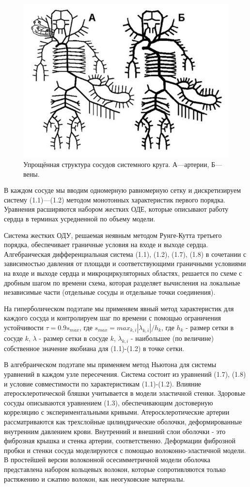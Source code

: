 \documentclass[a4paper, 14pt]{article}
\begin{document}
\begin{figure}[h]
\centering
\includegraphics[width=0.5\linewidth]{krug.png}
\caption{Упрощённая структура сосудов системного круга. А—артерии, Б—вены.}
\label{fig:mpr}
\end{figure}

В каждом сосуде мы вводим одномерную равномерную сетку и дискретизируем систему (1.1)—(1.2) методом монотонных характеристик первого порядка. Уравнения расширяются набором жестких ОДЕ, которые описывают работу сердца в терминах усредненной по объему модели.

Система жестких ОДУ, решаемая неявным методом Рунге-Кутта третьего порядка, обеспечивает граничные условия на входе и выходе сердца. Алгебраическая дифференциальная система (1.1), (1.2), (1.7), (1.8) в сочетании с зависимостью давления от площади и соответствующими граничными условиями на входе и выходе сердца и микроциркуляторных областях, решается по схеме с дробным шагом по времени схема, которая разделяет вычисления на локальные независимые части (отдельные сосуды и отдельные точки соединения).

На гиперболическом подэтапе мы применяем явный метод характеристик для каждого сосуда и контролируем шаг по времени с помощью ограничения устойчивости $\tau = 0.9 s_{max}$, где $s_{max}=max_{k,i}|\lambda _{k,i}|/h_k$, где $h_k$ - размер сетки в сосуде $k$, $λ$ - размер сетки в сосуде $k$,  $\lambda _{k,i}$ - наибольшее (по величине) собственное значение якобиана для (1.1)-(1.2) в точке сетки.

В алгебраическом подэтапе мы применяем метод Ньютона для системы уравнений в каждом узле пересечения. Система состоит из уравнений (1.7), (1.8) и условие совместимости по характеристикам (1.1)-(1.2). Влияние атеросклеротической бляшки учитывается в модели эластичной стенки. Здоровые сосуды описываются уравнением (1.3), обеспечивающим достоверную корреляцию с экспериментальными кривыми. Атеросклеротические артерии рассматриваются как трехслойные цилиндрические оболочки, деформированные внутренним давлением крови. Внутренний и внешний слои оболочки - это фиброзная крышка и стенка артерии, соответственно. Деформации фиброзной пробки и стенки сосуда моделируются с помощью волоконно-эластичной модели. В простейшей версии волоконной осесимметричной модели оболочка представлена набором кольцевых волокон, которые сопротивляются только растяжению и сжатию волокон, как неогуковские материалы.
\end{document}

